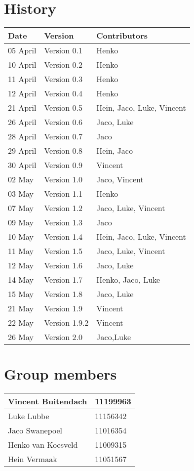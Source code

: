 
\section*{History}
\begin{center}
\begin{tabular}{|l|l|l|}
\hline
\textbf{Date} & \textbf{Version} & \textbf{Contributors}\\
\hline
05 April & Version 0.1 & Henko\\
\hline
10 April & Version 0.2 & Henko\\
\hline
11 April & Version 0.3 & Henko\\
\hline
12 April & Version 0.4 & Henko\\
\hline
21 April & Version 0.5 & Hein, Jaco, Luke, Vincent\\
\hline
26 April & Version 0.6 & Jaco, Luke\\
\hline
28 April & Version 0.7 & Jaco\\
\hline
29 April & Version 0.8 & Hein, Jaco\\
\hline
30 April & Version 0.9 & Vincent\\
\hline
02 May & Version 1.0 & Jaco, Vincent\\
\hline
03 May & Version 1.1 & Henko\\
\hline
07 May & Version 1.2 & Jaco, Luke, Vincent\\
\hline
09 May & Version 1.3 & Jaco\\
\hline
10 May & Version 1.4 & Hein, Jaco, Luke, Vincent\\
\hline
11 May & Version 1.5 & Jaco, Luke, Vincent\\
\hline
12 May & Version 1.6 & Jaco, Luke\\
\hline
14 May & Version 1.7 & Henko, Jaco, Luke\\
\hline
15 May & Version 1.8 & Jaco, Luke\\
\hline
21 May & Version 1.9 & Vincent\\
\hline
22 May & Version 1.9.2 & Vincent\\
\hline
26 May & Version 2.0 & Jaco,Luke\\
\hline
\end{tabular}

\vfill
\section*{Group members}

\begin{tabular}{|l|l|}

\hline
Vincent Buitendach & 11199963\\
\hline
Luke Lubbe & 11156342\\
\hline
Jaco Swanepoel & 11016354\\
\hline
Henko van Koesveld & 11009315\\
\hline
Hein Vermaak & 11051567\\
\hline

\end{tabular}

\end{center}

